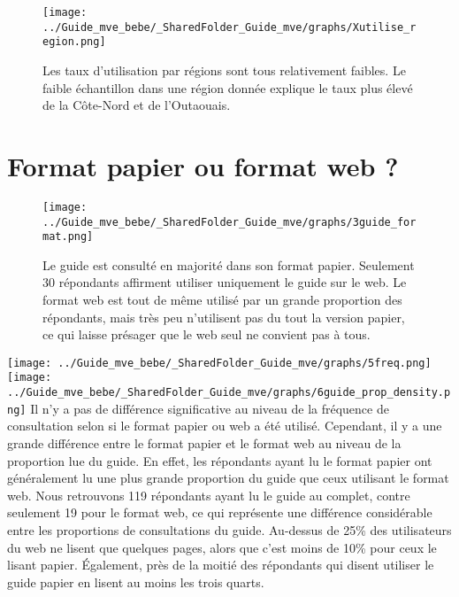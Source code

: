 \documentclass[
]{article}
\begin{document}
\begin{figure}[htbp]
  \centering
  \begin{minipage}{0.9\textwidth}
    \texttt{[image: ../Guide\_mve\_bebe/\_SharedFolder\_Guide\_mve/graphs/Xutilise\_region.png]}
  \end{minipage}%
  \begin{minipage}{0.1\textwidth}
    \textbf{} Les taux d'utilisation par régions sont tous relativement faibles. Le faible échantillon dans une région donnée explique le taux plus élevé de la Côte-Nord et de l'Outaouais.
  \end{minipage}
\end{figure}

\newpage

\hypertarget{format-papier-ou-format-web}{%
\section{Format papier ou format web
?}\label{format-papier-ou-format-web}}

\begin{figure}[htbp]
  \centering
  \begin{minipage}{0.7\textwidth}
    \texttt{[image: ../Guide\_mve\_bebe/\_SharedFolder\_Guide\_mve/graphs/3guide\_format.png]}
  \end{minipage}%
  \begin{minipage}{0.3\textwidth}
    \textbf{} Le guide est consulté en majorité dans son format papier. Seulement 30 répondants affirment utiliser uniquement le guide sur le web. Le format web est tout de même utilisé par un grande proportion des répondants, mais très peu n’utilisent pas du tout la version papier, ce qui laisse présager que le web seul ne convient pas à tous.
  \end{minipage}
\end{figure}
\newpage

\texttt{[image: ../Guide\_mve\_bebe/\_SharedFolder\_Guide\_mve/graphs/5freq.png]}
\newline \texttt{[image: ../Guide\_mve\_bebe/\_SharedFolder\_Guide\_mve/graphs/6guide\_prop\_density.png]}
\newline Il n'y a pas de différence significative au niveau de la
fréquence de consultation selon si le format papier ou web a été
utilisé. Cependant, il y a une grande différence entre le format papier
et le format web au niveau de la proportion lue du guide. En effet, les
répondants ayant lu le format papier ont généralement lu une plus grande
proportion du guide que ceux utilisant le format web. Nous retrouvons
119 répondants ayant lu le guide au complet, contre seulement 19 pour le
format web, ce qui représente une différence considérable entre les
proportions de consultations du guide. Au-dessus de 25\% des
utilisateurs du web ne lisent que quelques pages, alors que c'est moins
de 10\% pour ceux le lisant papier. Également, près de la moitié des
répondants qui disent utiliser le guide papier en lisent au moins les
trois quarts.
\end{document}
